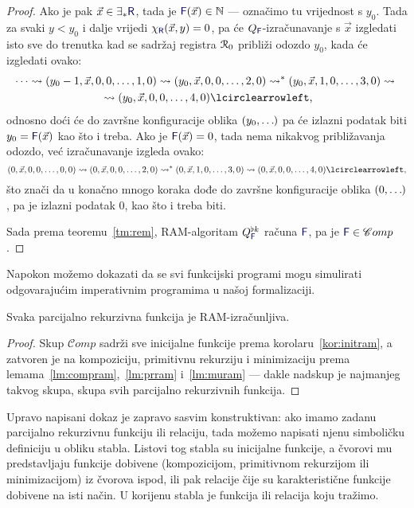 \begin{proof}
Ako je pak $\vec x\in\exists_*\f R$, tada je $\f F(\vec x)\in\N$ --- označimo tu vrijednost s $y_0$. Tada za svaki $y<y_0$ i dalje vrijedi $\chi_{\f R}(\vec x,y)=0$, pa će $Q_{\f F}$-izračunavanje s $\vec x$ izgledati isto sve do trenutka kad se sadržaj registra $\mathcal R_{0}$ približi odozdo $y_0$, kada će izgledati ovako:
\begin{multline}
    \dotsb\leadsto(y_0-1,\vec x,0,0,\dotsc,1,0)\leadsto
    (y_0,\vec x,0,0,\dotsc,2,0)\leadsto^*
    (y_0,\vec x,1,0,\dotsc,3,0)\leadsto{}\\
    {}\leadsto(y_0,\vec x,0,0,\dotsc,4,0)\lcirclearrowleft\text,
\end{multline}
	odnosno doći će do završne konfiguracije oblika $(y_0,\dotsc\mspace{-1mu})$ pa će izlazni podatak biti $y_0=\f F(\vec x)$ kao što i treba. Ako je $\f F(\vec x)=0$, tada nema nikakvog približavanja odozdo, već izračunavanje izgleda ovako:
\begin{equation*}
    (0,\vec x,0,0,\dotsc,0,0)\leadsto
    (0,\vec x,0,0,\dotsc,2,0)\leadsto^*
    (0,\vec x,1,0,\dotsc,3,0)\leadsto(0,\vec x,0,0,\dotsc,4,0)\lcirclearrowleft\text,
\end{equation*}
	što znači da u konačno mnogo koraka dođe do završne konfiguracije oblika $(0,\dotsc\mspace{-1mu})$, pa je izlazni podatak $0$, kao što i treba biti.

    Sada prema teoremu~\ref{tm:rem}, RAM-algoritam $Q_{\f F}^{\flat k}$ računa $\f F$, pa je $\f F\in\mathscr Comp$.
\end{proof}

Napokon možemo dokazati da se svi funkcijski programi mogu simulirati odgovarajućim imperativnim programima u našoj formalizaciji.

\begin{teorem}[{name=[RAM-izračunljivost parcijalno rekurzivnih funkcija]}]\label{tm:pir}
Svaka parcijalno rekurzivna funkcija je RAM-izračunljiva.
\end{teorem}
\begin{proof}
Skup $\mathscr Comp$ sadrži sve inicijalne funkcije prema korolaru~\ref{kor:initram}, a zatvoren je na kompoziciju, primitivnu rekurziju i minimizaciju prema lemama~\ref{lm:compram},~\ref{lm:prram} i~\ref{lm:muram} --- dakle nadskup je najmanjeg takvog skupa, skupa svih parcijalno rekurzivnih funkcija.
\end{proof}

Upravo napisani dokaz je zapravo sasvim konstruktivan: ako imamo zadanu parcijalno rekurzivnu funkciju ili relaciju, tada možemo napisati njenu simboličku definiciju u obliku stabla. Listovi tog stabla su inicijalne funkcije, a čvorovi mu predstavljaju funkcije dobivene (kompozicijom, primitivnom rekurzijom ili minimizacijom) iz čvorova ispod, ili pak relacije čije su karakteristične funkcije dobivene na isti način. U korijenu stabla je funkcija ili relacija koju tražimo.

